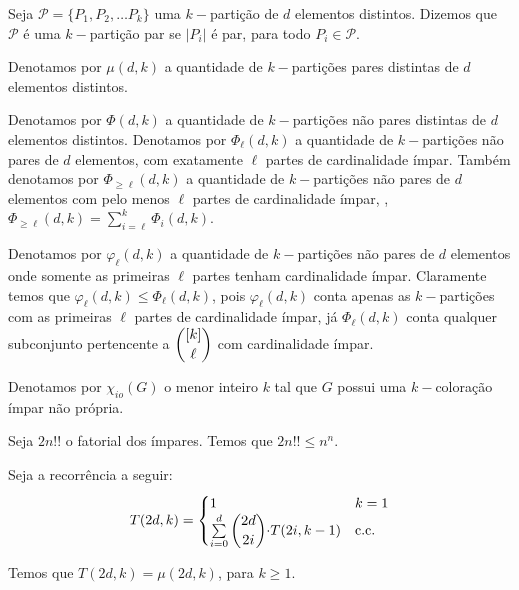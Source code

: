 \documentclass[12pt]{article}
\begin{document}
 \begin{defi}
 	\label{defi1}
 	Seja $\mathcal{P} = \{P_1, P_2, \ldots P_k \}$ uma $k-$partição de $d$ elementos distintos. Dizemos que $\mathcal{P}$ é uma $k-$partição par se $|P_i|$ é par, para todo $P_i \in \mathcal{P}$.
 \end{defi} \newbegin
  
 
 \begin{defi}
 	\label{defi2}
 	Denotamos por $\mu(d, k)$ a quantidade de $k-$partições pares distintas de $d$ elementos distintos.
 \end{defi} \newbegin
 
  \begin{defi}
 	\label{defi3}
 	Denotamos por $\Phi(d, k)$ a quantidade de $k-$partições não pares distintas de $d$ elementos distintos. Denotamos por $\Phi_\ell(d, k)$ a quantidade de $k-$partições não pares de $d$ elementos, com exatamente $\ell$
 	partes de cardinalidade ímpar. Também denotamos por $\Phi_{\geq \ell}(d, k)$ a quantidade de $k-$partições não pares de $d$ elementos com pelo menos $\ell$ partes de cardinalidade ímpar, \ie, $\Phi_{\geq \ell}(d, k) = \sum\limits_{i = \ell}^{k} \Phi_{i}(d, k)$. 
 \end{defi} \newbegin
  
   \begin{defi}
 	\label{def4}
   Denotamos por $\varphi_\ell(d, k)$ a quantidade de $k-$partições não pares de $d$ elementos onde somente as primeiras $\ell$ partes tenham cardinalidade ímpar. Claramente temos que $\varphi_\ell(d, k) \leq \Phi_\ell(d, k)$, pois $\varphi_\ell(d, k)$ conta apenas as $k-$partições com as primeiras $\ell$ partes de cardinalidade ímpar, já $\Phi_\ell(d, k)$ conta qualquer subconjunto pertencente a $\escolhe{[k]}{\ell}$ com cardinalidade ímpar.
 \end{defi} \newbegin
 
  \begin{defi}
 	\label{def5}
 	Denotamos por $\chi_{io}(G)$ o menor inteiro $k$ tal que  $G$ possui uma $k-$coloração ímpar não própria. 
 \end{defi} \newbegin
 
 \begin{prop}
 	\label{prop3}
 	Seja $2n!!$ o fatorial dos ímpares. Temos que $2n!! \leq n^n$.
 \end{prop} \newbegin
 
 
 \begin{lema}  
 	\label{lema2}
 	Seja a recorrência a seguir: \\
 	
 		\begin{equation}
 		T(2d, k) =
 		\begin{cases}
 			1 & \text{$k = 1$} \\
 			\sum\limits_{i = 0}^{d} \escolhe{2d}{2i} {\cdot} T(2i, k-1) & \text{c.c.} \\ 
 		\end{cases}
 	\end{equation}
 	
 	Temos que $T(2d, k) = \mu(2d, k)$, para $k \geq 1$.
 \end{lema}
 
\end{document}
